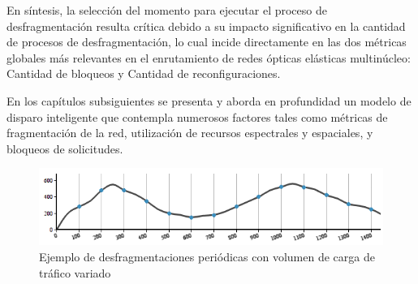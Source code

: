 En síntesis, la selección del momento para ejecutar el proceso de desfragmentación resulta crítica debido a su impacto significativo en la cantidad de procesos de desfragmentación, lo cual incide directamente en las dos métricas globales más relevantes en el enrutamiento de redes ópticas elásticas multinúcleo: Cantidad de bloqueos y Cantidad de reconfiguraciones.
%

En los capítulos subsiguientes se presenta y aborda en profundidad un modelo de disparo inteligente que contempla numerosos factores tales como métricas de fragmentación de la red, utilización de recursos espectrales y espaciales, y bloqueos de solicitudes.
%

\begin{figure}[h!]
    \centering
    \includegraphics[width=1\textwidth]{capitulos/img/ejemploPeriodico.png}
    \caption{Ejemplo de desfragmentaciones periódicas con volumen de carga de tráfico variado}
    \label{fig:ejemploPeriodico}
\end{figure}
%






